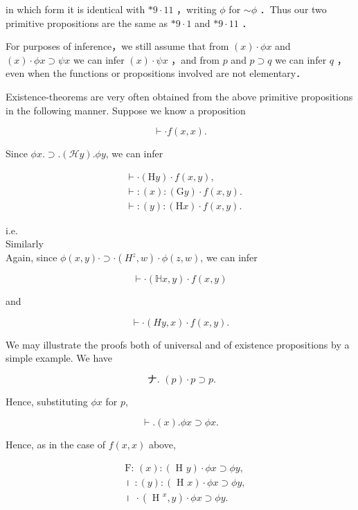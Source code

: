 \documentclass[10pt]{article}
\begin{document}
in which form it is identical with $* 9 \cdot 11$ ，writing $\phi$ for $\sim \phi$ ．Thus our two primitive propositions are the same as $* 9 \cdot 1$ and $* 9 \cdot 11$ ．

For purposes of inference，we still assume that from $(x) \cdot \phi x$ and $(x) \cdot \phi x \supset \psi x$ we can infer $(x) \cdot \psi x$ ，and from $p$ and $p \supset q$ we can infer $q$ ，even when the functions or propositions involved are not elementary．

Existence-theorems are very often obtained from the above primitive propositions in the following manner. Suppose we know a proposition

$$
\vdash \cdot f(x, x) .
$$

Since $\phi x . \supset .(\mathcal{H} y) . \phi y$, we can infer

$$
\begin{aligned}
& \vdash \cdot(\mathrm{H} y) \cdot f(x, y), \\
& \vdash:(x):(\mathrm{G} y) \cdot f(x, y) . \\
& \vdash:(y):(\mathrm{H} x) \cdot f(x, y) .
\end{aligned}
$$

i.e.\\
Similarly\\
Again, since $\phi(x, y) \cdot \supset \cdot\left(H^{z}, w\right) \cdot \phi(z, w)$, we can infer

$$
\vdash \cdot(\mathbb{H} x, y) \cdot f(x, y)
$$

and

$$
\vdash \cdot(H y, x) \cdot f(x, y) .
$$

We may illustrate the proofs both of universal and of existence propositions by a simple example. We have

$$
\text { ナ. }(p) \cdot p \supset p .
$$

Hence, substituting $\phi x$ for $p$,

$$
\vdash .(x) . \phi x \supset \phi x .
$$

Hence, as in the case of $f(x, x)$ above,

$$
\begin{aligned}
& \text { F: }(x):(\text { H } y) \cdot \phi x \supset \phi y, \\
& \text { । }:(y):(\text { H } x) \cdot \phi x \supset \phi y, \\
& \text { । } \cdot\left(\text { H }^{x}, y\right) \cdot \phi x \supset \phi y .
\end{aligned}
$$
\end{document}
